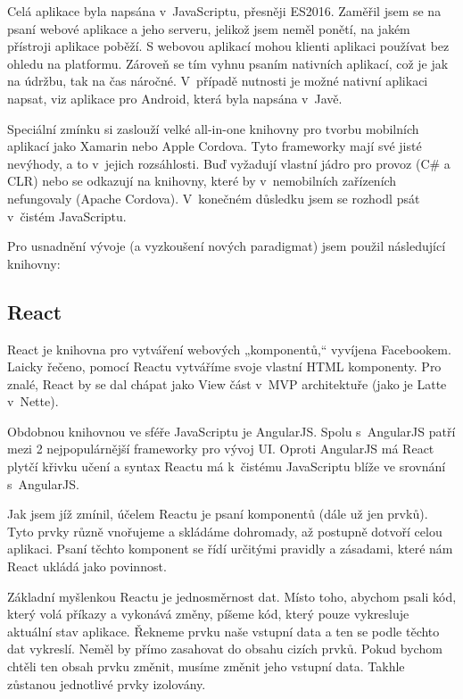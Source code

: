 \documentclass[a4paper,11pt,oneside]{article}
\begin{document}
Celá aplikace byla napsána v~JavaScriptu, přesněji ES2016. Zaměřil jsem se na psaní webové aplikace a jeho serveru, jelikož jsem neměl ponětí, na jakém přístroji aplikace poběží. S webovou aplikací mohou klienti aplikaci používat bez ohledu na platformu. Zároveň se tím vyhnu psaním nativních aplikací, což je jak na údržbu, tak na čas náročné. V~případě nutnosti je možné nativní aplikaci napsat, viz aplikace pro Android, která byla napsána v~Javě. 

Speciální zmínku si zaslouží velké all-in-one knihovny pro tvorbu mobilních aplikací jako Xamarin nebo Apple Cordova. Tyto frameworky mají své jisté nevýhody, a to v~jejich rozsáhlosti. Buď vyžadují vlastní jádro pro provoz (C\# a CLR) nebo se odkazují na knihovny, které by v~nemobilních zařízeních nefungovaly (Apache Cordova). V~konečném důsledku jsem se rozhodl psát v~čistém JavaScriptu.

Pro usnadnění vývoje (a vyzkoušení nových paradigmat) jsem použil následující knihovny:

\subsection{React}
\label{sec:react}

React je knihovna pro vytváření webových „komponentů,“ vyvíjena Facebookem. Laicky řečeno, pomocí Reactu vytváříme svoje vlastní HTML komponenty. Pro znalé, React by se dal chápat jako View část v~MVP architektuře (jako je Latte v~Nette). 

Obdobnou knihovnou ve sféře JavaScriptu je AngularJS. Spolu s~AngularJS patří mezi 2 nejpopulárnější frameworky pro vývoj UI. Oproti AngularJS má React plytčí křivku učení a syntax Reactu má k~čistému JavaScriptu blíže ve srovnání s~AngularJS.

Jak jsem jíž zmínil, účelem Reactu je psaní komponentů (dále už jen prvků). Tyto prvky různě vnořujeme a skládáme dohromady, až postupně dotvoří celou aplikaci. Psaní těchto komponent se řídí určitými pravidly a zásadami, které nám React ukládá jako povinnost. 

Základní myšlenkou Reactu je jednosměrnost dat. Místo toho, abychom psali kód, který volá příkazy a vykonává změny, píšeme kód, který pouze vykresluje aktuální stav aplikace. Řekneme prvku naše vstupní data a ten se podle těchto dat vykreslí. Neměl by přímo zasahovat do obsahu cizích prvků. Pokud bychom chtěli ten obsah prvku změnit, musíme změnit jeho vstupní data. Takhle zůstanou jednotlivé prvky izolovány.
\end{document}
